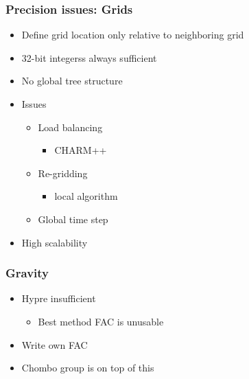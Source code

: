 \documentclass{beamer}
\begin{document}
    \begin{frame}[fragile] \frametitle{Precision issues: Grids}
      \begin{itemize}
        \item Define grid location only relative to neighboring grid
        \item 32-bit integerss always sufficient
        \item No global tree structure
        \item Issues
        \begin{itemize}
          \item Load balancing
          \begin{itemize}
            \item CHARM++
          \end{itemize}
          \item Re-gridding
          \begin{itemize}
            \item local algorithm
          \end{itemize}
          \item Global time step
        \end{itemize}
        \item High scalability
      \end{itemize}
\end{frame}

    \begin{frame}[fragile] \frametitle{Gravity}
      \begin{itemize}
        \item Hypre insufficient
        \begin{itemize}
          \item Best method FAC is unusable
        \end{itemize}
        \item Write own FAC
        \item Chombo group is on top of this
      \end{itemize}
\end{frame}
\end{document}

